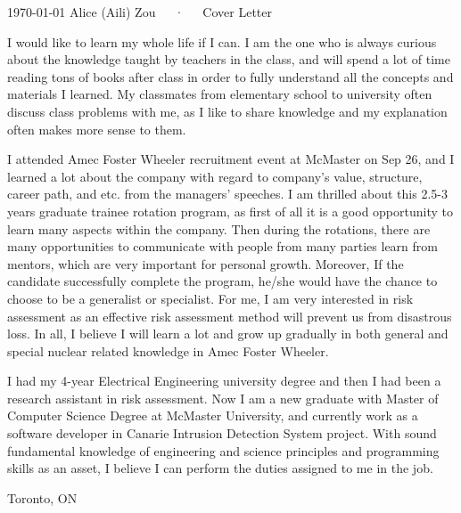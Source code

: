 \documentclass[11pt, a4paper]{awesome-cv}
\begin{document}
\makecvheader[R]

\makecvfooter
  {\today}
  {Alice (Aili) Zou~~~·~~~Cover Letter}
  {}

\makelettertitle

\begin{cvletter}

I would like to learn my whole life if I can. I am the one who is always curious about the knowledge taught by teachers in the class,
and will spend a lot of time reading tons of books after class in order to fully understand all the concepts and materials I learned.
My classmates from elementary school to university often discuss class problems with me, as I like to share knowledge and my
explanation often makes more sense to them.

I attended Amec Foster Wheeler recruitment event at McMaster on Sep 26, and I learned a lot about the company with regard to
company’s value, structure, career path, and etc. from the managers’ speeches. I am thrilled about this 2.5-3 years graduate trainee
rotation program, as first of all it is a good opportunity to learn many aspects within the company. Then during the rotations, there
are many opportunities to communicate with people from many parties learn from mentors, which are very important for personal
growth. Moreover, If the candidate successfully complete the program, he/she would have the chance to choose to be a generalist
or specialist. For me, I am very interested in risk assessment as an effective risk assessment method will prevent us from disastrous
loss. In all, I believe I will learn a lot and grow up gradually in both general and special nuclear related knowledge in Amec Foster
Wheeler.

I had my 4-year Electrical Engineering university degree and then I had been a research assistant in risk assessment. Now I am a new
graduate with Master of Computer Science Degree at McMaster University, and currently work as a software developer in Canarie
Intrusion Detection System project. With sound fundamental knowledge of engineering and science principles and programming
skills as an asset, I believe I can perform the duties assigned to me in the job.

Toronto, ON


\end{cvletter}


\makeletterclosing
\end{document}
